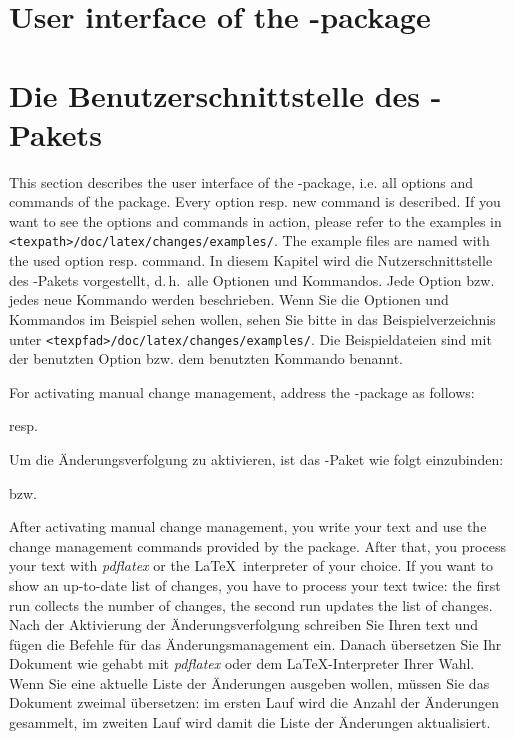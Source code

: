 \ifENGLISH
	\section{User interface of the -package}
\fi
	\ifGERMAN
		\section{Die Benutzerschnittstelle des -Pakets}
	\fi
\label{sec:user}

\ifENGLISH
	This section describes the user interface of the -package, i.e. all options and commands of the package.
	Every option resp. new command is described.
	If you want to see the options and commands in action, please refer to the examples in \texttt{<texpath>/doc/latex/changes/examples/}.
	The example files are named with the used option resp. command.
\fi
	\ifGERMAN
		In diesem Kapitel wird die Nutzerschnittstelle des -Pakets vorgestellt, d.\,h.\ alle Optionen und Kommandos.
		Jede Option bzw. jedes neue Kommando werden beschrieben.
		Wenn Sie die Optionen und Kommandos im Beispiel sehen wollen, sehen Sie bitte in das Beispielverzeichnis unter \texttt{<texpfad>/doc/latex/changes/examples/}.
		Die Beispieldateien sind mit der benutzten Option bzw. dem benutzten Kommando benannt.
	\fi

\ifENGLISH
	For activating manual change management, address the -package as follows:


	resp.

\fi
	\ifGERMAN
		Um die Änderungsverfolgung zu aktivieren, ist das -Paket wie folgt einzubinden:


		bzw.

	\fi

\ifENGLISH
	After activating manual change management, you write your text and use the change management commands provided by the package.
	After that, you process your text with \emph{pdflatex} or the \LaTeX\ interpreter of your choice.
	If you want to show an up-to-date list of changes, you have to process your text twice: the first run collects the number of changes, the second run updates the list of changes.
\fi
	\ifGERMAN
		Nach der Aktivierung der Änderungsverfolgung schreiben Sie Ihren text und fügen die Befehle für das Änderungsmanagement ein.
		Danach übersetzen Sie Ihr Dokument wie gehabt mit \emph{pdflatex} oder dem \LaTeX-Interpreter Ihrer Wahl.
		Wenn Sie eine aktuelle Liste der Änderungen ausgeben wollen, müssen Sie das Dokument zweimal übersetzen: im ersten Lauf wird die Anzahl der Änderungen gesammelt, im zweiten Lauf wird damit die Liste der Änderungen aktualisiert.
	\fi


